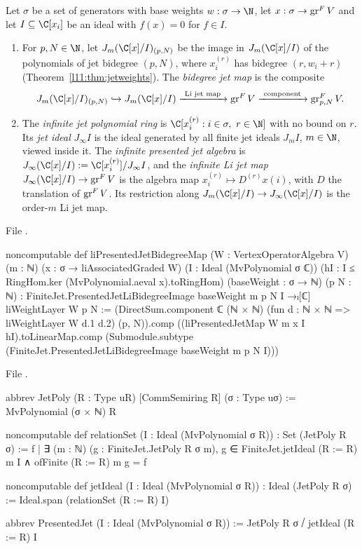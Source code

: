 \begin{definition}\label{l11:def:infjetmap}
Let $\sigma$ be a set of generators with base weights $w:\sigma\to\N$, let $x:\sigma\to\operatorname{gr}^FV$ and let $I\subseteq\C[x_i]$
be an ideal with $f(x)=0$ for $f\in I$.
\begin{enumerate}
\item For $p,N\in\N$, let $J_m(\C[x]/I)_{(p,N)}$ be the image in $J_m(\C[x]/I)$ of the polynomials of jet bidegree
  $(p,N)$, where $x_i^{(r)}$ has bidegree $(r,w_i+r)$ (Theorem~\ref{l11:thm:jetweights}). The \emph{bidegree jet map}
  is the composite
  \begin{equation*}
    J_m(\C[x]/I)_{(p,N)}\hookrightarrow J_m(\C[x]/I)\xrightarrow{\ \text{Li jet map}\ }\lelevengr^FV
    \xrightarrow{\ \text{component}\ }\lelevengr^F_{p,N}V .
  \end{equation*}
\item The \emph{infinite jet polynomial ring} is $\C[x_i^{(r)} : i\in\sigma,\ r\in\N]$ with no bound on $r$. Its
  \emph{jet ideal} $J_\infty I$ is the ideal generated by all finite jet ideals $J_mI$, $m\in\N$, viewed inside it.
  The \emph{infinite presented jet algebra} is $J_\infty(\C[x]/I) := \C[x_i^{(r)}]/J_\infty I$, and the \emph{infinite
  Li jet map} $J_\infty(\C[x]/I)\to\lelevengr^FV$ is the algebra map $x_i^{(r)}\mapsto D^{(r)}x(i)$, with $D$ the
  translation of $\operatorname{gr}^FV$. Its restriction along $J_m(\C[x]/I)\to J_\infty(\C[x]/I)$ is the order-$m$ Li jet map.
\end{enumerate}
\end{definition}
\noindent File .
\begin{leancode}
noncomputable def liPresentedJetBidegreeMap
    (W : VertexOperatorAlgebra V) (m : ℕ)
    (x : σ → liAssociatedGraded W) (I : Ideal (MvPolynomial σ ℂ))
    (hI : I ≤ RingHom.ker (MvPolynomial.aeval x).toRingHom)
    (baseWeight : σ → ℕ) (p N : ℕ) :
    FiniteJet.PresentedJetLiBidegreeImage baseWeight m p N I →ₗ[ℂ]
      liWeightLayer W p N :=
  (DirectSum.component ℂ (ℕ × ℕ)
      (fun d : ℕ × ℕ => liWeightLayer W d.1 d.2) (p, N)).comp
    ((liPresentedJetMap W m x I hI).toLinearMap.comp
      (Submodule.subtype
        (FiniteJet.PresentedJetLiBidegreeImage baseWeight m p N I)))
\end{leancode}
\noindent File .
\begin{leancode}
abbrev JetPoly (R : Type uR) [CommSemiring R] (σ : Type uσ) :=
  MvPolynomial (σ × ℕ) R

noncomputable def relationSet (I : Ideal (MvPolynomial σ R)) : Set (JetPoly R σ) :=
  {f | ∃ (m : ℕ) (g : FiniteJet.JetPoly R σ m),
    g ∈ FiniteJet.jetIdeal (R := R) m I ∧ ofFinite (R := R) m g = f}

noncomputable def jetIdeal (I : Ideal (MvPolynomial σ R)) : Ideal (JetPoly R σ) :=
  Ideal.span (relationSet (R := R) I)

abbrev PresentedJet (I : Ideal (MvPolynomial σ R)) :=
  JetPoly R σ ⧸ jetIdeal (R := R) I
\end{leancode}
